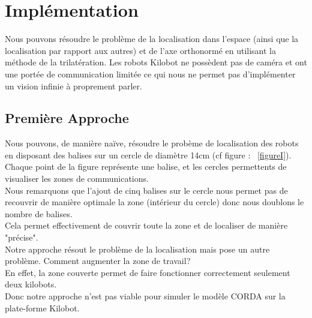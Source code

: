 \documentclass[a4paper,8pt]{report}
\begin{document}

\section*{Impl\'ementation}\label{sec:name}

Nous pouvons r\'esoudre le probl\`eme de la localisation dans l'espace (ainsi que la localisation par rapport aux autres) et de l'axe orthonorm\'e en utilisant la m\'ethode de la trilat\'eration. Les robots Kilobot ne poss\`edent pas de cam\'era et ont une port\'ee de communication limit\'ee ce qui nous ne permet pas d'impl\'ementer un vision infinie \`a proprement parler.\\

\subsection*{Premi\`ere Approche}\label{sec:name}

Nous pouvons, de mani\`ere na\"{i}ve, r\'esoudre le prob\`eme de localisation des robots en disposant des balises sur un cercle de diam\`etre 14cm (cf figure : ~\ref{figureI}).\\
Chaque point de la figure repr\'esente une balise, et les cercles permettents de visualiser les zones de communications.\\
Nous remarquons que l'ajout de cinq balises sur le cercle nous permet pas de recouvrir de mani\`ere optimale la zone (int\'erieur du cercle) donc nous doublons le nombre de balises.\\
Cela permet effectivement de couvrir toute la zone et de localiser de mani\`ere "pr\'ecise".\\
Notre approche r\'esout le probl\`eme de la localisation mais pose un autre probl\`eme. Comment augmenter la zone de travail?\\
En effet, la zone couverte permet de faire fonctionner correctement seulement deux kilobots.\\
Donc notre approche n'est pas viable pour simuler le mod\`ele CORDA sur la plate-forme Kilobot.\\
\end{document}
